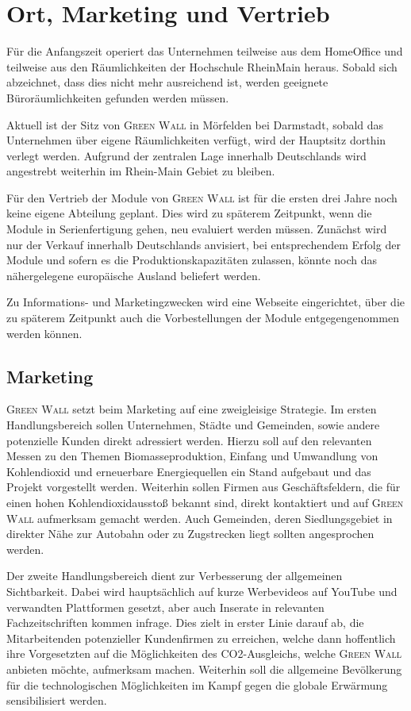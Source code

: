 \chapter{Ort, Marketing und Vertrieb}

    Für die Anfangszeit operiert das Unternehmen teilweise aus dem HomeOffice und teilweise aus den Räumlichkeiten der Hochschule RheinMain heraus. 
    Sobald sich abzeichnet, dass dies nicht mehr ausreichend ist, werden geeignete Büroräumlichkeiten gefunden werden müssen.

Aktuell ist der Sitz von \textsc{Green Wall} in Mörfelden bei Darmstadt, sobald das Unternehmen über eigene Räumlichkeiten verfügt, wird der Hauptsitz dorthin verlegt werden. 
Aufgrund der zentralen Lage innerhalb Deutschlands wird angestrebt weiterhin im Rhein-Main Gebiet zu bleiben. 

Für den Vertrieb der Module von \textsc{Green Wall} ist für die ersten drei Jahre noch keine eigene Abteilung geplant. 
Dies wird zu späterem Zeitpunkt, wenn die Module in Serienfertigung gehen, neu evaluiert werden müssen. 
Zunächst wird nur der Verkauf innerhalb Deutschlands anvisiert, bei entsprechendem Erfolg der Module und sofern es die Produktionskapazitäten zulassen, könnte noch das nähergelegene europäische Ausland beliefert werden. 

Zu Informations- und Marketingzwecken wird eine Webseite eingerichtet, über die zu späterem Zeitpunkt auch die Vorbestellungen der Module entgegengenommen werden können. 

    \section{Marketing}

        \textsc{Green Wall} setzt beim Marketing auf eine zweigleisige Strategie.
        Im ersten Handlungsbereich sollen Unternehmen, Städte und Gemeinden, sowie andere potenzielle Kunden direkt adressiert werden.
        Hierzu soll auf den relevanten Messen zu den Themen Biomasseproduktion, Einfang und Umwandlung von Kohlendioxid und erneuerbare Energiequellen ein Stand aufgebaut und das Projekt vorgestellt werden.
        Weiterhin sollen Firmen aus Geschäftsfeldern, die für einen hohen Kohlendioxidausstoß bekannt sind, direkt kontaktiert und auf \textsc{Green Wall} aufmerksam gemacht werden.
        Auch Gemeinden, deren Siedlungsgebiet in direkter Nähe zur Autobahn oder zu Zugstrecken liegt sollten angesprochen werden.

        Der zweite Handlungsbereich dient zur Verbesserung der allgemeinen Sichtbarkeit.
        Dabei wird hauptsächlich auf kurze Werbevideos auf YouTube und verwandten Plattformen gesetzt, aber auch Inserate in relevanten Fachzeitschriften kommen infrage.
        Dies zielt in erster Linie darauf ab, die Mitarbeitenden potenzieller Kundenfirmen zu erreichen, welche dann hoffentlich ihre Vorgesetzten auf die Möglichkeiten des CO2-Ausgleichs, welche \textsc{Green Wall} anbieten möchte, aufmerksam machen.
        Weiterhin soll die allgemeine Bevölkerung für die technologischen Möglichkeiten im Kampf gegen die globale Erwärmung sensibilisiert werden.

